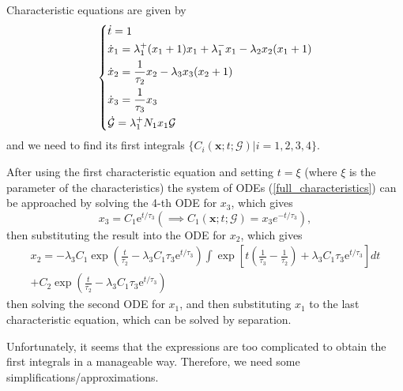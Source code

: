 \documentclass[a4paper, 11pt]{article}
\begin{document}
Characteristic equations are given by
\begin{equation} \label{full_characteristics}
  \begin{dcases}
    \dot t = 1\\
    \dot x_1 = \lambda_1^+(x_1+1)x_1 + \lambda_1^-x_1 - \lambda_2x_2(x_1+1)\\
    \dot x_2 = \frac{1}{\tau_2}x_2 - \lambda_3x_3(x_2+1)\\
    \dot x_3 = \frac{1}{\tau_3}x_3\\
    \dot {\mathcal G} = \lambda_1^+N_1x_1\mathcal G
  \end{dcases}
\end{equation}
and we need to find its first integrals $\{C_i(\mathbf x; t; \mathcal G)|i=1,2,3,4\}$.

After using the first characteristic equation and setting $t = \xi$ (where $\xi$ is the parameter of the characteristics) the system of ODEs (\ref{full_characteristics}) can be approached by solving the 4-th ODE for $x_3$, which gives
\begin{equation*}
  x_3 = C_1\mathrm e^{t/\tau_3} \left(\implies C_1(\mathbf x; t; \mathcal G) = x_3e^{-t/\tau_3}\right),
\end{equation*}
then substituting the result into the ODE for $x_2$, which gives
\begin{equation*}
  \begin{split}
    x_2 = -\lambda_3C_1\exp\left(\frac{t}{\tau_2}-\lambda_3C_1\tau_3\mathrm e^{t/\tau_3}\right)\int\exp\left[t\left(\frac{1}{\tau_3} - \frac{1}{\tau_2}\right) + \lambda_3C_1\tau_3\mathrm e^{t/\tau_3}\right]dt\\ + C_2\exp\left(\frac{t}{\tau_2}-\lambda_3C_1\tau_3\mathrm e^{t/\tau_3}\right)
  \end{split}
\end{equation*}
then solving the second ODE for $x_1$, and then substituting $x_1$ to the last characteristic equation, which can be solved by separation.

Unfortunately, it seems that the expressions are too complicated to obtain the first integrals in a manageable way. Therefore, we need some simplifications/approximations.
\end{document}
